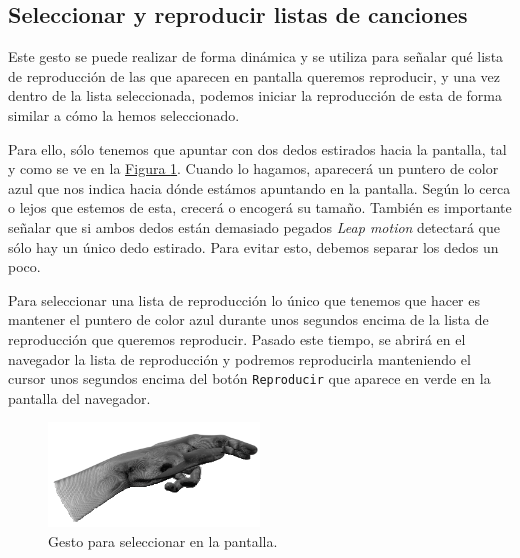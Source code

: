 \documentclass[10pt,a4paper,spanish]{article}
\begin{document}


\subsection{\textcolor{verde}Seleccionar y reproducir listas de canciones}

Este gesto se puede realizar de forma dinámica y se utiliza para señalar qué lista de reproducción de las que aparecen en pantalla queremos reproducir, y una vez dentro de la lista seleccionada, podemos iniciar la reproducción de esta de forma similar a cómo la hemos seleccionado.

Para ello, sólo tenemos que apuntar con dos dedos estirados hacia la pantalla, tal y como se ve en la \hyperref[point]{Figura \ref*{point}}. Cuando lo hagamos, aparecerá un puntero de color azul que nos indica hacia dónde estámos apuntando en la pantalla. Según lo cerca o lejos que estemos de esta, crecerá o encogerá su tamaño. También es importante señalar que si ambos dedos están demasiado pegados \textit{Leap motion} detectará que sólo hay un único dedo estirado. Para evitar esto, debemos separar los dedos un poco.

Para seleccionar una lista de reproducción lo único que tenemos que hacer es mantener el puntero de color azul durante unos segundos encima de la lista de reproducción que queremos reproducir. Pasado este tiempo, se abrirá en el navegador la lista de reproducción y podremos reproducirla manteniendo el cursor unos segundos encima del botón \texttt{Reproducir} que aparece en verde en la pantalla del navegador. 

\begin{figure}[H]
    \centering     
    \includegraphics[width=0.5\textwidth]{images/point}
    \caption{Gesto para seleccionar en la pantalla.}
    \label{point}
\end{figure}
\end{document}
